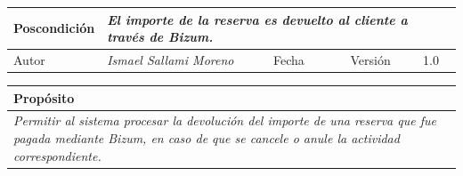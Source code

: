 \begin{table}[H]
\begin{tabular}{llllllll}
    \multicolumn{1}{|l|}{Poscondición}                           & \multicolumn{7}{l|}{{\color[HTML]{808080} \textit{El importe de la reserva es devuelto al cliente a través de Bizum.}}}                                                                                                                                                                                                                                                       \\ \hline
    \multicolumn{1}{|l|}{Autor}                                  & \multicolumn{1}{l|}{{\color[HTML]{808080} \textit{Ismael Sallami Moreno}}}                           & \multicolumn{2}{l|}{Fecha}                                                   & \multicolumn{1}{l|}{}                          & \multicolumn{2}{l|}{Versión}                                                      & \multicolumn{1}{l|}{1.0}                                                     \\ \hline
    \end{tabular}
    \end{table}

    \begin{table}[H]
        \begin{tabular}{llllllll}
    \hline
    \multicolumn{8}{|l|}{\cellcolor[HTML]{F2F2F2}Propósito}                                                                                                                                                                                                                                                                                                                                                                                           \\ \hline
    \multicolumn{8}{|p{15cm}|}{{\color[HTML]{808080} \textit{Permitir al sistema procesar la devolución del importe de una reserva que fue pagada mediante Bizum, en caso de que se cancele o anule la actividad correspondiente.}}}                                                                                                                                                                                                             \\ \hline
    \end{tabular}
    \end{table}

